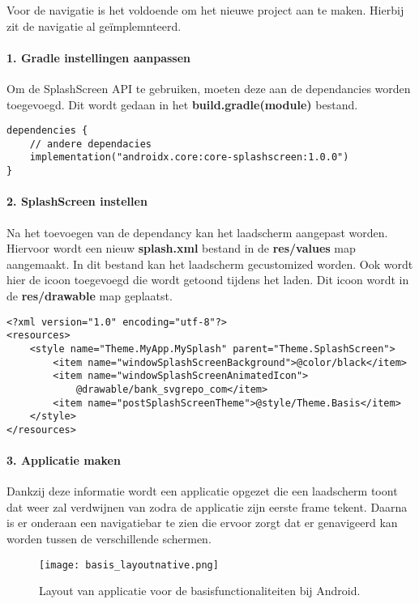 Voor de navigatie is het voldoende om het nieuwe project aan te maken. 
Hierbij zit de navigatie al geïmplemnteerd.

\paragraph{1. Gradle instellingen aanpassen}
Om de SplashScreen API te gebruiken, moeten deze aan de dependancies worden toegevoegd. Dit wordt gedaan in
het \textbf{build.gradle(module)} bestand.
\begin{verbatim}
dependencies {
    // andere dependacies
    implementation("androidx.core:core-splashscreen:1.0.0")
}
\end{verbatim}

\paragraph{2. SplashScreen instellen}
Na het toevoegen van de dependancy kan het laadscherm aangepast worden. 
Hiervoor wordt een nieuw \textbf{splash.xml} bestand in de \textbf{res/values} map aangemaakt. In dit 
bestand kan het laadscherm gecustomized worden. Ook wordt hier de icoon toegevoegd die wordt
getoond tijdens het laden. Dit icoon wordt in de \textbf{res/drawable} map geplaatst.
\begin{verbatim}
<?xml version="1.0" encoding="utf-8"?>
<resources>
    <style name="Theme.MyApp.MySplash" parent="Theme.SplashScreen">
        <item name="windowSplashScreenBackground">@color/black</item>
        <item name="windowSplashScreenAnimatedIcon">
            @drawable/bank_svgrepo_com</item>
        <item name="postSplashScreenTheme">@style/Theme.Basis</item>
    </style>
</resources>
\end{verbatim}

\paragraph{3. Applicatie maken}
Dankzij deze informatie wordt een applicatie opgezet die een laadscherm toont dat weer zal verdwijnen 
van zodra de applicatie zijn eerste frame tekent. Daarna is er onderaan een navigatiebar te zien die ervoor zorgt dat 
er genavigeerd kan worden tussen de verschillende schermen.
\begin{figure}[H]
    \centering
    \texttt{[image: basis\_layoutnative.png]}
    \caption{Layout van applicatie voor de basisfunctionaliteiten bij Android.}
\end{figure}
